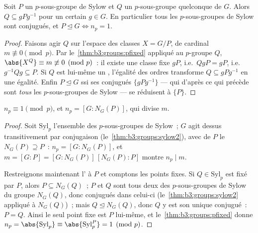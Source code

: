 \begin{theorem}\label{thm:b3:groups:sylow2}
Soit $P$ un $p$-sous-groupe de Sylow et $Q$ un $p$-sous-groupe
quelconque de $G$. Alors $Q \subseteq gPg^{-1}$ pour un certain $g
\in G$. En particulier tous les $p$-sous-groupes de Sylow sont
conjugués, et $P \trianglelefteq G \iff n_p = 1$.
\end{theorem}

\begin{proof}
Faisons agir $Q$ sur l'espace des classes $X = G/P$, de cardinal
$m \not\equiv 0 \pmod p$. Par le~\cref{thm:b3:groups:pfixed}
appliqué au $p$-groupe $Q$, $\abs{X^Q} \equiv m \not\equiv 0
\pmod p$~: il existe une classe fixe $gP$, i.e.\ $QgP = gP$,
i.e.\ $g^{-1}Qg \subseteq P$. Si $Q$ est lui-même un , l'égalité des ordres transforme $Q \subseteq gPg^{-1}$
en une égalité. Enfin $P \trianglelefteq G$ ssi ses conjugués
$\{gPg^{-1}\}$ --- qui d'après ce qui précède sont \emph{tous}
les $p$-sous-groupes de Sylow --- se réduisent à $\{P\}$.
\end{proof}

\begin{theorem}\label{thm:b3:groups:sylow3}
$n_p \equiv 1 \pmod p$, et $n_p = [G : N_G(P)]$, qui divise $m$.
\end{theorem}

\begin{proof}
Soit $\mathrm{Syl}_p$ l'ensemble des $p$-sous-groupes de Sylow~;
$G$ agit dessus transitivement par conjugaison
(le~\cref{thm:b3:groups:sylow2}), avec  de $P$ le
 $N_G(P) \supseteq P$~: $n_p = [G : N_G(P)]$, et $m
= [G:P] = [G:N_G(P)]\,[N_G(P):P]$ montre $n_p \mid m$.

Restreignons maintenant l' à $P$ et comptons les points
fixes. Si $Q \in \mathrm{Syl}_p$ est fixé par $P$, alors $P
\subseteq N_G(Q)$~; $P$ et $Q$ sont tous deux des $p$-sous-groupes
de Sylow du groupe $N_G(Q)$, donc conjugués dans celui-ci
(le~\cref{thm:b3:groups:sylow2} appliqué à $N_G(Q)$)~; mais $Q
\trianglelefteq N_G(Q)$, donc $Q$ y est son unique conjugué~: $P
= Q$. Ainsi le seul point fixe est $P$ lui-même, et
le~\cref{thm:b3:groups:pfixed} donne $n_p =
\abs{\mathrm{Syl}_p} \equiv \abs{\mathrm{Syl}_p^P} = 1 \pmod p$.
\end{proof}

